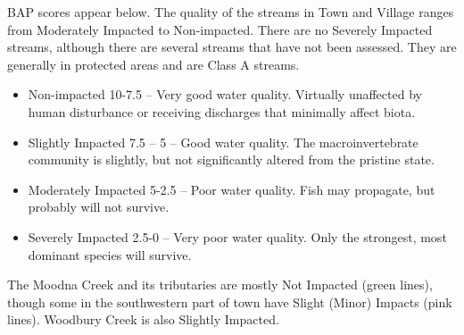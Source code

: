 BAP scores appear below. The quality of the streams in Town and Village ranges 
from Moderately Impacted to Non-impacted. There are no Severely Impacted 
streams, although there are several streams that have not been assessed. They 
are generally in protected areas and are Class A streams.
\begin{itemize}
    \item Non-impacted 10-7.5 – Very good water quality. Virtually unaffected 
    by human disturbance or receiving discharges that minimally affect 
    biota.
    \item Slightly Impacted 7.5 – 5 – Good water quality. The 
    macroinvertebrate community is slightly, but not significantly altered from 
    the pristine state.
    \item Moderately Impacted 5-2.5 – Poor water quality. Fish may propagate, 
    but probably will not survive.
    \item Severely Impacted 2.5-0 – Very poor water quality. Only the 
    strongest, most dominant species will survive.
\end{itemize}

The Moodna Creek and its tributaries are mostly Not Impacted (green lines), 
though some in the southwestern part of town have Slight (Minor) Impacts (pink 
lines). Woodbury Creek is also Slightly Impacted.

\label{map:biomonitoringandprioritywaterbodies}
